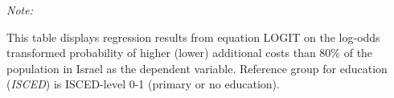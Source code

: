 \begin{table}[htbp!]
\begin{adjustbox}{width = 1\textwidth, max height = 0.95\textheight, center}
\begin{threeparttable}[b]
         \begin{tablenotes}\item \medskip \textit{Note:}
            \item This table displays regression results from equation LOGIT on the log-odds transformed probability of higher (lower) additional costs than 80\% of the population in Israel as the dependent variable. Reference group for education (\textit{ISCED}) is ISCED-level 0-1 (primary or no education).
         \end{tablenotes}
      \end{threeparttable}
   \end{adjustbox}
\end{table}



